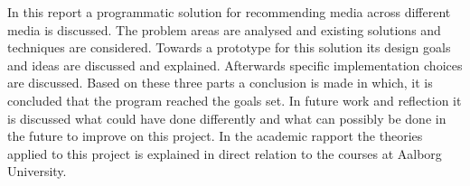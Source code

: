In this report a programmatic solution for recommending media across different media is discussed. The problem areas are analysed and existing solutions and techniques are considered. Towards a prototype for this solution its design goals and ideas are discussed and explained. Afterwards specific implementation choices are discussed. Based on these three parts a conclusion is made in which, it is concluded that the program reached the goals set. 
In future work and reflection it is discussed what could have done differently and what can possibly be done in the future to improve on this project.
In the academic rapport the theories applied to this project is explained in direct relation to the courses at Aalborg University. 